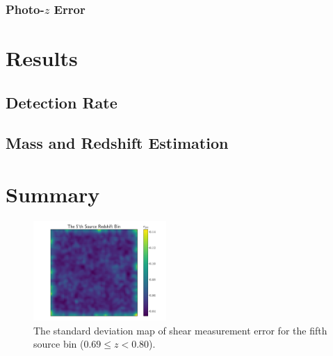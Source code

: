 \documentclass[twocolumn]{aastex62}
\begin{document}
\subsubsection{Photo-$z$ Error} 

\section{Results}
\label{sec:Res}

\subsection{Detection Rate}

\subsection{Mass and Redshift Estimation}


\section{Summary}
\label{sec:Sum}

\begin{figure}[!ht]
 \centering
 \includegraphics[width=0.45\textwidth]{noise_std_map_pix.pdf}
 \caption{The standard deviation map of shear measurement error for the fifth source bin ($0.69 \leq z < 0.80 $).}
\end{figure}




\appendix
\end{document}
